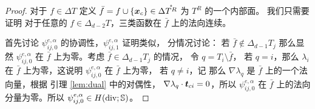 \documentclass[letterpaper,12pt]{article}
\begin{document}
\begin{proof}
对于 $f \in \Delta T$ 定义 $\bar{f} = f\cup \{\boldsymbol{x}_c\} \in
\Delta \mathring{T^R}$ 为 $T^R$ 的一个内部面。
我们只需要证明
对于任意的 $f \in \Delta_{d-2} T$，三类函数在 $\bar{f}$ 上的法向连续。

首先讨论 $\psi_{ij, 0}^{e, \alpha}$ 的协调性，$\psi_{ij, 1}^{e, \alpha}$ 证明类似，
分情况讨论：
若 $\bar{f} \not\in \Delta_{d-1} T_j$ 那么显然 $\psi_{ij, 0}^{e, \alpha}$ 在
$\bar{f}$ 上为零。考虑 $\bar{f} \in \Delta_{d-1} T_j$ 的情况，
令 $q = T_i\setminus \bar{f}$，
若 $q = i$，那么 $\lambda_i$ 在 $\bar{f}$ 上为零，这说明 
$\psi_{ij, 0}^{e, \alpha}$ 在 $\bar{f}$ 上为零，
若 $q \not = i$，记 那么 $\nabla \lambda_q$ 
是 $\bar{f}$ 上的一个法向量，根据 引理 \ref{lem:dual} 中的对偶性，
$\nabla \lambda_q \cdot \boldsymbol{t}_{ci} = 0$，所以 $\psi_{ij, 0}^{e, \alpha}$ 
在 $\bar{f}$ 上的法向分量为零。所以 $\psi_{ij, 0}^{e, \alpha} \in H(\operatorname{div};
\mathbb{S})$。


\end{proof}
\end{document}
